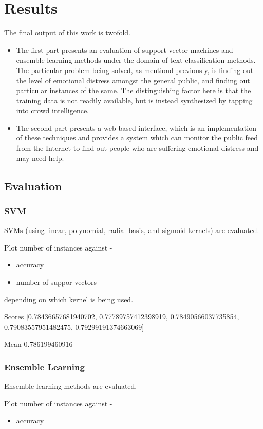\chapter{Results}
\label{chapter:Results}

The final output of this work is twofold.
\begin{itemize}
    \item{The first part presents an evaluation of support vector machines and ensemble learning methods under the domain of text classification methods. The particular problem being solved, as mentiond previously, is finding out the level of emotional distress amongst the general public, and finding out particular instances of the same. The distinguishing factor here is that the training data is not readily available, but is instead synthesized by tapping into crowd intelligence.}
    \item{The second part presents a web based interface, which is an implementation of these techniques and provides a system which can monitor the public feed from the Internet to find out people who are suffering emotional distress and may need help.}
\end{itemize}

\section{Evaluation}
\subsection{SVM}
SVMs (using linear, polynomial, radial basis, and sigmoid kernels) are evaluated.

Plot number of instances against -
\begin{itemize}
    \item{accuracy}
    \item{number of suppor vectors}
\end{itemize}
depending on which kernel is being used.

Scores [0.78436657681940702, 0.77789757412398919, 0.78490566037735854, 0.79083557951482475, 0.79299191374663069]

Mean 0.786199460916

\subsection{Ensemble Learning}
Ensemble learning methods are evaluated.

Plot number of instances against -
\begin{itemize}
    \item{accuracy}
\end{itemize}


